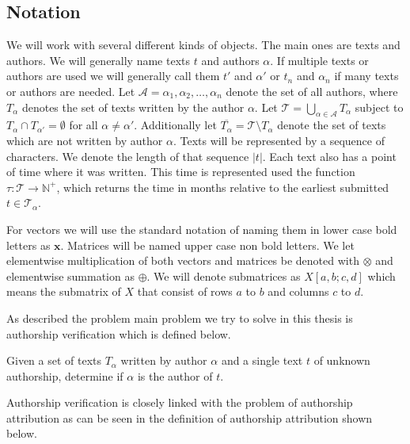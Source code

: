 \subsection{Notation}

We will work with several different kinds of objects. The main ones are texts
and authors. We will generally name texts $t$ and authors $\alpha$. If multiple
texts or authors are used we will generally call them $t'$ and $\alpha'$ or
$t_n$ and $\alpha_n$ if many texts or authors are needed. Let $\mathcal{A} =
{\alpha_1, \alpha_2, \dots, \alpha_n}$ denote the set of all authors, where
$T_\alpha$ denotes the set of texts written by the author $\alpha$. Let
$\mathcal{T} = \bigcup_{\alpha \in \mathcal{A}} T_\alpha$ subject to $T_{\alpha}
\cap T_{\alpha'} = \emptyset$ for all $\alpha \neq \alpha'$. Additionally
let $\overline{T_\alpha} = \mathcal{T} \setminus T_\alpha$ denote the set of
texts which are not written by author $\alpha$. Texts will be represented by a
sequence of characters. We denote the length of that sequence $|t|$. Each text
also has a point of time where it was written. This time is represented used the
function $\tau \colon \mathcal{T} \rightarrow \mathbb{N}^+$, which returns the
time in months relative to the earliest submitted $t \in \mathcal{T_\alpha}$.

For vectors we will use the standard notation of naming them in lower case bold
letters as $\mathbf{x}$. Matrices will be named upper case non bold letters.
We let elementwise multiplication of both vectors and matrices be denoted with
$\otimes$ and elementwise summation as $\oplus$. We will denote submatrices as
$X[a,b;c,d]$ which means the submatrix of $X$ that consist of rows $a$ to $b$
and columns $c$ to $d$.


As described the problem main problem we try to solve in this thesis is
authorship verification which is defined below.

\begin{definition}
    \label{def:authorship_verification}

    Given a set of texts $T_\alpha$ written by author $\alpha$ and a single text
    $t$ of unknown authorship, determine if $\alpha$ is the author of $t$.

\end{definition}

Authorship verification is closely linked with the problem of authorship
attribution as can be seen in the definition of authorship attribution shown
below.

